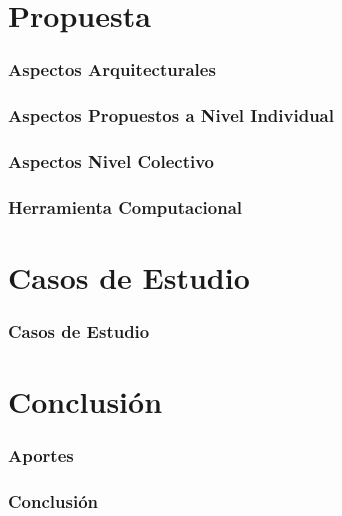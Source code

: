 \documentclass{beamer}
\begin{document}
\section{Propuesta}

\begin{frame}
\frametitle{Aspectos Arquitecturales}

\end{frame}

\begin{frame}
\frametitle{Aspectos Propuestos a Nivel Individual}

\end{frame}

\begin{frame}
\frametitle{Aspectos Nivel Colectivo}

\end{frame}

\begin{frame}
\frametitle{Herramienta Computacional}

\end{frame}

\section{Casos de Estudio}
\begin{frame}
\frametitle{Casos de Estudio}

\end{frame}


\section{Conclusión}
\begin{frame}
\frametitle{Aportes}

\end{frame}

\begin{frame}
\frametitle{Conclusión}

\end{frame}


\ThankYouFrame

\end{document}
